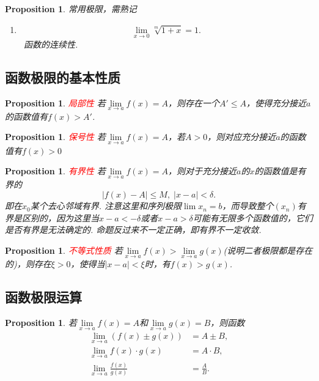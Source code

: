 \documentclass{article}
\newtheorem{proposition}[theorem]{Proposition}
\newcommand{\hints}{{\color{blue} \text{hints}}}
\newcommand{\redt}[1]{\textcolor{red}{#1}}
\begin{document}
\begin{proposition}
\rm {\color{red}常用极限，需熟记}
\begin{enumerate}
	\item 
	$$
	\lim\limits_{x \rightarrow 0} \sqrt[m]{1+x} = 1.
	$$
	\hints\ 函数的连续性.
\end{enumerate}
\end{proposition}

\subsection{函数极限的基本性质}

\begin{proposition}
\rm \redt{局部性} 若$\lim\limits_{x \rightarrow a} f(x) = A$，则存在一个$A' \leq A$，使得充分接近$a$的函数值有$f(x) > A'$. 
\end{proposition}

\begin{proposition}
\rm \redt{保号性} 若$\lim\limits_{x \rightarrow a} f(x) = A$，若$A > 0$，则对应充分接近$a$的函数值有$f(x) > 0$
\end{proposition}

\begin{proposition}
\rm \redt{有界性} 若$\lim\limits_{x \rightarrow a} f(x) = A$，则对于充分接近$a$的$x$的函数值是有界的
$$
|f(x)-A| \leq M ,\; |x-a| < \delta.
$$
即在$x_0$某个去心邻域有界. {\color{blue} 注意这里和序列极限$\lim x_n = b$，而导致整个$(x_n)$有界是区别的，因为这里当$x-a < -\delta$或者$x-a > \delta$可能有无限多个函数值的，它们是否有界是无法确定的}. {\color{red} 命题反过来不一定正确，即有界不一定收敛}.
\end{proposition}


\begin{proposition}
\rm \redt{不等式性质} 若$\lim\limits_{x \rightarrow a} f(x) >  \lim\limits_{x \rightarrow a} g(x)$(说明二者极限都是存在的)，则存在$\xi > 0$，使得当$|x-a| < \xi$时，有$f(x) > g(x)$. 
\end{proposition}


\subsection{函数极限运算}

\begin{proposition}
\rm 若$\lim\limits_{x \rightarrow a} f(x) = A$和$\lim\limits_{x \rightarrow a} g(x) = B$，则函数
$$
\begin{array}{ll}
\lim\limits_{x \rightarrow a} (f(x) \pm  g(x)) &= A \pm B,\\
\lim\limits_{x \rightarrow a} f(x) \cdot g(x) & = A\cdot B, \\
\lim\limits_{x \rightarrow a} \frac{f(x)}{g(x)} &= \frac{A}{B}.
\end{array}
$$
\end{proposition}
\end{document}
